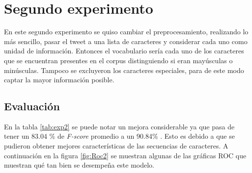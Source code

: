 \section{Segundo experimento}
\par En este segundo experimento se quiso cambiar el preprocesamiento, realizando lo más sencillo, pasar el tweet a una lista de caracteres y considerar cada uno como unidad de información. Entonces el vocabulario sería cada uno de los caracteres que se encuentran presentes en el corpus distinguiendo si eran mayúsculas o minúsculas. Tampoco se excluyeron los caracteres especiales, para de este modo captar la mayor información posible.
\subsection{Evaluación}
\begin{center}
	
\end{center}


\par En la tabla \ref{tab:exp2} se puede notar un mejora considerable ya que pasa de tener un 83.04 \% de \textit{F-score} promedio a un 90.84\% . Esto es debido a que se pudieron obtener mejores características de las secuencias de caracteres. A continuación en la figura \ref{fig:Roc2} se muestran algunas de las gráficas ROC que muestran qué tan bien se desempeña este modelo.

